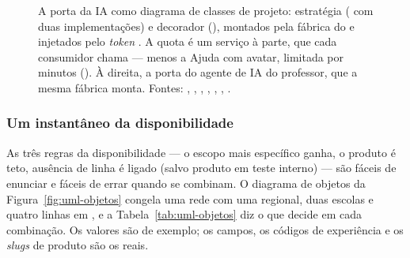 \begin{figure}[H]
{}
\caption[Classes: a porta da IA]{A porta da IA como diagrama de classes de
  projeto: estratégia ( com duas implementações) e decorador
  (), montados pela fábrica do  e
  injetados pelo \emph{token} . A quota é um serviço à parte,
  que cada consumidor chama --- menos a Ajuda com avatar, limitada por minutos
  (). À direita, a porta do agente de IA do professor, que a
  mesma fábrica monta. Fontes: , ,
  , ,
  , ,
  .}
\label{fig:uml-classes-ia}
\end{figure}

\subsubsection{Um instantâneo da disponibilidade}

As três regras da disponibilidade --- o escopo mais específico ganha, o produto é
teto, ausência de linha é ligado (salvo produto em teste interno) --- são fáceis de enunciar e fáceis de errar
quando se combinam. O diagrama de objetos da Figura~\ref{fig:uml-objetos} congela
uma rede com uma regional, duas escolas e quatro linhas em ,
e a Tabela~\ref{tab:uml-objetos} diz o que  decide
em cada combinação. Os valores são de exemplo; os campos, os códigos de
experiência e os \emph{slugs} de produto são os reais.


